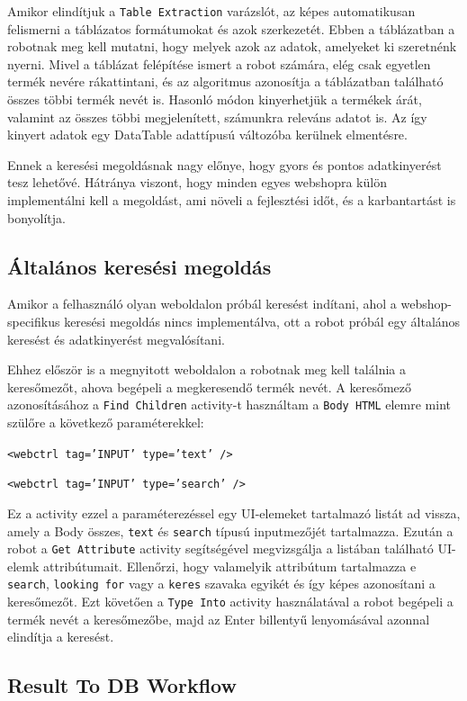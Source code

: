 \documentclass[
]{thesis-ekf}
\theoremstyle{definition}
\theoremstyle{remark}
\begin{document}
Amikor elindítjuk a \texttt{Table Extraction} varázslót, az képes automatikusan felismerni a táblázatos formátumokat és azok szerkezetét. Ebben a táblázatban a robotnak meg kell mutatni, hogy melyek azok az adatok, amelyeket ki szeretnénk nyerni. Mivel a táblázat felépítése ismert a robot számára, elég csak egyetlen termék nevére rákattintani, és az algoritmus azonosítja a táblázatban található összes többi termék nevét is. Hasonló módon kinyerhetjük a termékek árát, valamint az összes többi megjelenített, számunkra releváns adatot is. Az így kinyert adatok egy DataTable adattípusú változóba kerülnek elmentésre.

Ennek a keresési megoldásnak nagy előnye, hogy gyors és pontos adatkinyerést tesz lehetővé. Hátránya viszont, hogy minden egyes webshopra külön implementálni kell a megoldást, ami növeli a fejlesztési időt, és a karbantartást is bonyolítja.

\subsection*{Általános keresési megoldás}
Amikor a felhasználó olyan weboldalon próbál keresést indítani, ahol a webshop-specifikus keresési megoldás nincs implementálva, ott a robot próbál egy általános keresést és adatkinyerést megvalósítani.

Ehhez először is a megnyitott weboldalon a robotnak meg kell találnia a keresőmezőt, ahova begépeli a megkeresendő termék nevét. A keresőmező azonosításához a \texttt{Find Children} activity-t használtam a \texttt{Body HTML} elemre mint szülőre a következő paraméterekkel:
\begin{center}
	\texttt{<webctrl tag='INPUT' type='text' />}
	
	\texttt{<webctrl tag='INPUT' type='search' />}
\end{center}
Ez a activity ezzel a paraméterezéssel egy UI-elemeket tartalmazó listát ad vissza, amely a Body összes, \texttt{text} és \texttt{search} típusú inputmezőjét tartalmazza. Ezután a robot a \texttt{Get Attribute} activity segítségével megvizsgálja a listában található UI-elemk attribútumait. Ellenőrzi, hogy valamelyik attribútum tartalmazza e \texttt{search}, \texttt{looking for} vagy a \texttt{keres} szavaka egyikét és így képes azonosítani a keresőmezőt. Ezt követően a \texttt{Type Into} activity használatával a robot begépeli a termék nevét a keresőmezőbe, majd az Enter billentyű lenyomásával azonnal elindítja a keresést.

\subsection{Result To DB Workflow}
\end{document}
